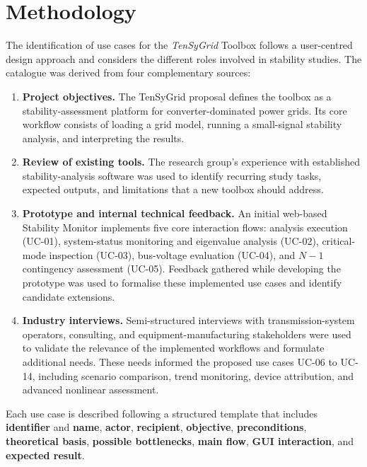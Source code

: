 \section{Methodology}

The identification of use cases for the \textit{TenSyGrid} Toolbox follows a user-centred design approach and considers the different roles involved in stability studies. The catalogue was derived from four complementary sources:

\begin{enumerate}
  \item \textbf{Project objectives.} The TenSyGrid proposal defines the toolbox as a stability-assessment platform for converter-dominated power grids. Its core workflow consists of loading a grid model, running a small-signal stability analysis, and interpreting the results.
  \item \textbf{Review of existing tools.} The research group's experience with established stability-analysis software was used to identify recurring study tasks, expected outputs, and limitations that a new toolbox should address.
  \item \textbf{Prototype and internal technical feedback.} An initial web-based Stability Monitor implements five core interaction flows: analysis execution (UC-01), system-status monitoring and eigenvalue analysis (UC-02), critical-mode inspection (UC-03), bus-voltage evaluation (UC-04), and $N-1$ contingency assessment (UC-05). Feedback gathered while developing the prototype was used to formalise these implemented use cases and identify candidate extensions.
  \item \textbf{Industry interviews.} Semi-structured interviews with transmission-system operators, consulting, and equipment-manufacturing stakeholders were used to validate the relevance of the implemented workflows and formulate additional needs. These needs informed the proposed use cases UC-06 to UC-14, including scenario comparison, trend monitoring, device attribution, and advanced nonlinear assessment.
\end{enumerate}

Each use case is described following a structured template that includes \textbf{identifier} and \textbf{name}, \textbf{actor}, \textbf{recipient}, \textbf{objective}, \textbf{preconditions}, \textbf{theoretical basis}, \textbf{possible bottlenecks}, \textbf{main flow}, \textbf{GUI interaction}, and \textbf{expected result}.


